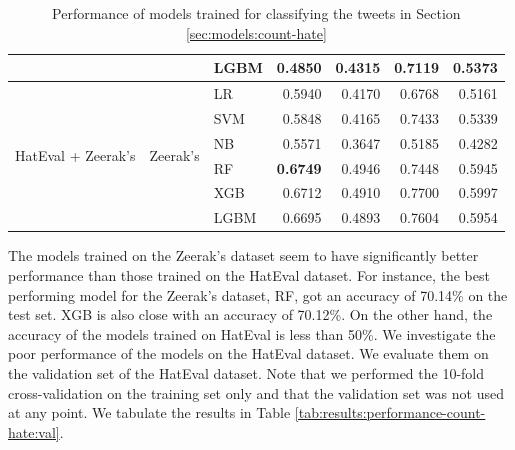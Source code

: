 \begin{table}[htbp]
\begin{tabular}{p{2cm}p{2cm}lrrrr}
 &  & LGBM & 0.4850 & 0.4315 & 0.7119 & 0.5373 \\ \hline
\multirow{6}{*}{\parbox{2cm}{HatEval + Zeerak's}} & \multirow{6}{*}{Zeerak's} & LR & 0.5940 & 0.4170 & 0.6768 & 0.5161 \\
 &  & SVM & 0.5848 & 0.4165 & 0.7433 & 0.5339 \\
 &  & NB & 0.5571 & 0.3647 & 0.5185 & 0.4282 \\
 &  & RF & \textbf{0.6749} & 0.4946 & 0.7448 & 0.5945 \\
 &  & XGB & 0.6712 & 0.4910 & 0.7700 & 0.5997 \\
 &  & LGBM & 0.6695 & 0.4893 & 0.7604 & 0.5954 \\ \hline
\end{tabular}
\caption{Performance of models trained for classifying the tweets in Section \ref{sec:models:count-hate}}
\label{tab:results:performance-count-hate}
\end{table}

The models trained on the Zeerak's dataset seem to have significantly better performance than those trained on the HatEval dataset. For instance, the best performing model for the Zeerak's dataset, \ac{RF}, got an accuracy of 70.14\% on the test set. \ac{XGB} is also close with an accuracy of 70.12\%. On the other hand, the accuracy of the models trained on HatEval is less than 50\%. We investigate the poor performance of the models on the HatEval dataset. We evaluate them on the validation set of the HatEval dataset. Note that we performed the 10-fold cross-validation on the training set only and that the validation set was not used at any point. We tabulate the results in Table \ref{tab:results:performance-count-hate:val}.

